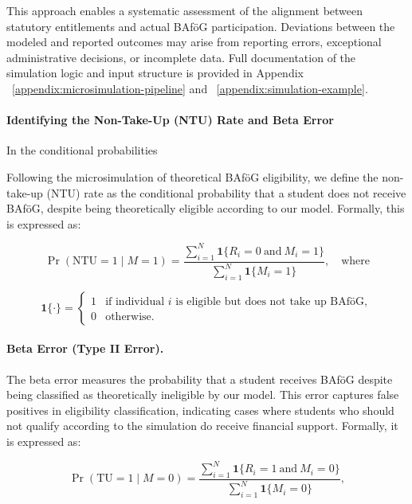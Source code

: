 This approach enables a systematic assessment of the alignment between statutory entitlements and actual BAföG participation. 
Deviations between the modeled and reported outcomes may arise from reporting errors, exceptional administrative decisions, or incomplete data. 
Full documentation of the simulation logic and input structure is provided in Appendix ~\ref{appendix:microsimulation-pipeline} and ~\ref{appendix:simulation-example}.

\paragraph{Identifying the Non-Take-Up (NTU) Rate and Beta Error}
In the conditional probabilities 

Following the microsimulation of theoretical BAföG eligibility, we define the non-take-up (NTU) rate as the conditional probability that a student does not receive BAföG, despite being theoretically eligible according to our model. Formally, this is expressed as:

\begin{equation}
\Pr(\text{NTU} = 1 \mid M = 1) = \frac{\sum_{i=1}^{N} \mathbf{1}\{R_i = 0 \ \text{and} \ M_i = 1\}}{\sum_{i=1}^{N} \mathbf{1}\{M_i = 1\}}, \quad\text{where} 
\end{equation}

\begin{equation}
  \mathbf{1}\{\cdot\} =
  \begin{cases}
  1 & \text{if individual } i \text{ is eligible but does not take up BAföG}, \\
  0 & \text{otherwise}.
  \end{cases}
\label{eq:indicator-function-ntu}
\end{equation}


\paragraph{Beta Error (Type II Error).}  
The beta error measures the probability that a student receives BAföG despite being classified as theoretically ineligible by our model. This error captures false positives in eligibility classification, indicating cases where students who should not qualify according to the simulation do receive financial support. Formally, it is expressed as:

\begin{equation}
\Pr(\text{TU} = 1 \mid M = 0) = \frac{\sum_{i=1}^{N} \mathbf{1}\{R_i = 1 \ \text{and} \ M_i = 0\}}{\sum_{i=1}^{N} \mathbf{1}\{M_i = 0\}},
\end{equation}

